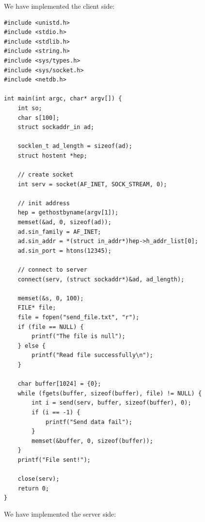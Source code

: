 \documentclass[13pt]{article}
\begin{document}
\noindent%
We have implemented the client side:
\begin{verbatim}
#include <unistd.h>
#include <stdio.h>
#include <stdlib.h>
#include <string.h>
#include <sys/types.h>
#include <sys/socket.h>
#include <netdb.h>

int main(int argc, char* argv[]) {
    int so;
    char s[100];
    struct sockaddr_in ad;

    socklen_t ad_length = sizeof(ad);
    struct hostent *hep;

    // create socket
    int serv = socket(AF_INET, SOCK_STREAM, 0);

    // init address
    hep = gethostbyname(argv[1]);
    memset(&ad, 0, sizeof(ad));
    ad.sin_family = AF_INET;
    ad.sin_addr = *(struct in_addr*)hep->h_addr_list[0];
    ad.sin_port = htons(12345);

    // connect to server
    connect(serv, (struct sockaddr*)&ad, ad_length);
    
    memset(&s, 0, 100);
    FILE* file;
    file = fopen("send_file.txt", "r");
    if (file == NULL) {
    	printf("The file is null");
    } else {
    	printf("Read file successfully\n");
    }
    
    char buffer[1024] = {0};
    while (fgets(buffer, sizeof(buffer), file) != NULL) {
    	int i = send(serv, buffer, sizeof(buffer), 0);
    	if (i == -1) {
    		printf("Send data fail");
    	}
    	memset(&buffer, 0, sizeof(buffer));
    }
    printf("File sent!");
    
    close(serv);
    return 0;
}
\end{verbatim}

\noindent%
We have implemented the server side:
\end{document}
